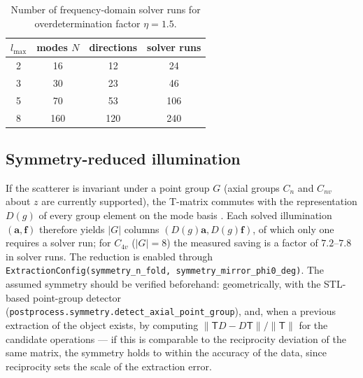 \documentclass[11pt]{article}
\begin{document}
\begin{table}[ht]
\centering
\caption{Number of frequency-domain solver runs for overdetermination
factor $\eta = 1.5$.}
\label{tab:cost}
\begin{tabular}{cccc}
\toprule
$l_{\max}$ & modes $N$ & directions & solver runs\\
\midrule
2 & 16 & 12 & 24\\
3 & 30 & 23 & 46\\
5 & 70 & 53 & 106\\
8 & 160 & 120 & 240\\
\bottomrule
\end{tabular}
\end{table}

\subsection{Symmetry-reduced illumination}
\label{sec:symmetryreduction}
If the scatterer is invariant under a point group $G$ (axial groups
$C_n$ and $C_{nv}$ about $z$ are currently supported), the T-matrix
commutes with the representation $D(g)$ of every group element on the
mode basis \cite{Waterman1971}.  Each solved illumination
$(\mathbf{a}, \mathbf{f})$ therefore yields $|G|$ columns
$(D(g)\mathbf{a}, D(g)\mathbf{f})$, of which only one requires a solver
run; for $C_{4v}$ ($|G| = 8$) the measured saving is a factor of
$7.2$--$7.8$ in solver runs.  The reduction is enabled through
\texttt{ExtractionConfig(symmetry\_n\_fold,
symmetry\_mirror\_phi0\_deg)}.  The assumed symmetry should be verified
beforehand: geometrically, with the STL-based point-group detector
(\texttt{postprocess.symmetry.detect\_axial\_point\_group}), and, when
a previous extraction of the object exists, by computing
$\|\mathsf{T}D - D\mathsf{T}\|/\|\mathsf{T}\|$ for the candidate
operations --- if this is comparable to the reciprocity deviation of
the same matrix, the symmetry holds to within the accuracy of the
data, since reciprocity sets the scale of the extraction error.
\end{document}
